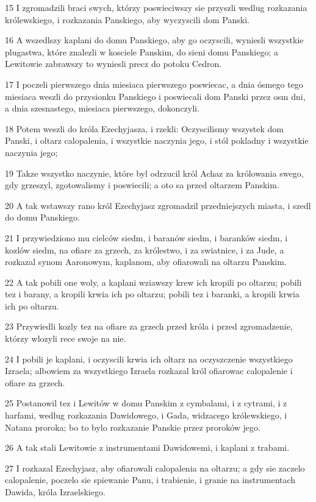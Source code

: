 \par 15 I zgromadzili braci swych, którzy poswieciwszy sie przyszli wedlug rozkazania królewskiego, i rozkazania Panskiego, aby wyczyscili dom Panski.
\par 16 A wszedlszy kaplani do domu Panskiego, aby go oczyscili, wyniesli wszystkie plugastwa, które znalezli w kosciele Panskim, do sieni domu Panskiego; a Lewitowie zabrawszy to wyniesli precz do potoku Cedron.
\par 17 I poczeli pierwszego dnia miesiaca pierwszego poswiecac, a dnia ósmego tego miesiaca weszli do przysionku Panskiego i poswiecali dom Panski przez osm dni, a dnia szesnastego, miesiaca pierwszego, dokonczyli.
\par 18 Potem weszli do króla Ezechyjasza, i rzekli: Oczyscilismy wszystek dom Panski, i oltarz calopalenia, i wszystkie naczynia jego, i stól pokladny i wszystkie naczynia jego;
\par 19 Takze wszystko naczynie, które byl odrzucil król Achaz za królowania swego, gdy grzeszyl, zgotowalismy i poswiecili; a oto sa przed oltarzem Panskim.
\par 20 A tak wstawszy rano król Ezechyjasz zgromadzil przedniejszych miasta, i szedl do domu Panskiego.
\par 21 I przywiedziono mu cielców siedm, i baranów siedm, i baranków siedm, i kozlów siedm, na ofiare za grzech, za królestwo, i za swiatnice, i za Jude, a rozkazal synom Aaronowym, kaplanom, aby ofiarowali na oltarzu Panskim.
\par 22 A tak pobili one woly, a kaplani wziawszy krew ich kropili po oltarzu; pobili tez i barany, a kropili krwia ich po oltarzu; pobili tez i baranki, a kropili krwia ich po oltarzu.
\par 23 Przywiedli kozly tez na ofiare za grzech przed króla i przed zgromadzenie, którzy wlozyli rece swoje na nie.
\par 24 I pobili je kaplani, i oczyscili krwia ich oltarz na oczyszczenie wszystkiego Izraela; albowiem za wszystkiego Izraela rozkazal król ofiarowac calopalenie i ofiare za grzech.
\par 25 Postanowil tez i Lewitów w domu Panskim z cymbalami, i z cytrami, i z harfami, wedlug rozkazania Dawidowego, i Gada, widzacego królewskiego, i Natana proroka; bo to bylo rozkazanie Panskie przez proroków jego.
\par 26 A tak stali Lewitowie z instrumentami Dawidowemi, i kaplani z trabami.
\par 27 I rozkazal Ezechyjasz, aby ofiarowali calopalenia na oltarzu; a gdy sie zaczelo calopalenie, poczelo sie spiewanie Panu, i trabienie, i granie na instrumentach Dawida, króla Izraelskiego.
